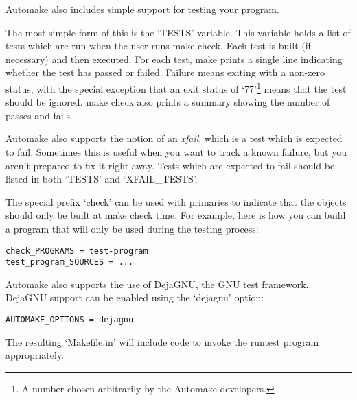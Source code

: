 Automake also includes simple support for testing your
program.


The most simple form of this is the `TESTS' variable. This variable holds a 
list of tests which are run when the user runs make check. Each test is 
built (if necessary) and then executed. For each test, make prints a 
single line indicating whether the test has passed or failed. Failure means 
exiting with a non-zero status, with the special exception that an exit 
status of `77'\footnote{A number chosen arbitrarily by the Automake developers.}
means that the test should be ignored. make check also prints a summary 
showing the number of passes and fails. 


Automake also supports the notion of an \textit{xfail}, which is a test which is expected to fail. Sometimes this is useful when you want to track a known failure, but you aren't prepared to fix it right away. Tests which are expected to fail should be listed in both `TESTS' and `XFAIL\_{}TESTS'. 


The special prefix `check' can be used with primaries to indicate that the objects should only be built at make check time. For example, here is how you can build a program that will only be used during the testing process: 


\begin{Verbatim}[frame=single]
check_PROGRAMS = test-program
test_program_SOURCES = ...
\end{Verbatim}

Automake also supports the use of DejaGNU, the GNU test framework. DejaGNU support can be enabled using the `dejagnu' option: 


\begin{Verbatim}[frame=single]
AUTOMAKE_OPTIONS = dejagnu
\end{Verbatim}


The resulting `Makefile.in' will include code to invoke the runtest program appropriately. 
